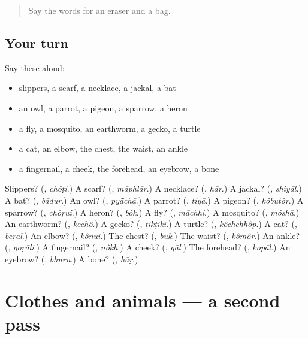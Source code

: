 \label{lesson:BN-R129-first-pass-fruit-vegetables-and-food}



\begin{quote}
Say the words for an eraser and a bag.
\end{quote}

\subsection*{Your turn}
Say these aloud:

\begin{itemize}
\raggedright
  \item slippers, a scarf, a necklace, a jackal, a bat
  \item an owl, a parrot, a pigeon, a sparrow, a heron
  \item a fly, a mosquito, an earthworm, a gecko, a turtle
  \item a cat, an elbow, the chest, the waist, an ankle
  \item a fingernail, a cheek, the forehead, an eyebrow, a bone
\end{itemize}

\begin{tcolorbox}[breakable,colback=teal!4,colframe=teal!35!black,title={Before you move on}]
Slippers? (\textbf{}, \emph{chôṭi}.) A scarf? (\textbf{}, \emph{māphlār}.) A necklace? (\textbf{}, \emph{hār}.) A jackal? (\textbf{}, \emph{shiyāl}.) A bat? (\textbf{}, \emph{bādur}.) An owl? (\textbf{}, \emph{pyā̃chā}.) A parrot? (\textbf{}, \emph{tiyā}.) A pigeon? (\textbf{}, \emph{kôbutôr}.) A sparrow? (\textbf{}, \emph{chôṛui}.) A heron? (\textbf{}, \emph{bôk}.) A fly? (\textbf{}, \emph{māchhi}.) A mosquito? (\textbf{}, \emph{môshā}.) An earthworm? (\textbf{}, \emph{kechô}.) A gecko? (\textbf{}, \emph{ṭikṭiki}.) A turtle? (\textbf{}, \emph{kôchchhôp}.) A cat? (\textbf{}, \emph{beṛāl}.) An elbow? (\textbf{}, \emph{kônui}.) The chest? (\textbf{}, \emph{buk}.) The waist? (\textbf{}, \emph{kômôr}.) An ankle? (\textbf{}, \emph{goṛāli}.) A fingernail? (\textbf{}, \emph{nôkh}.) A cheek? (\textbf{}, \emph{gāl}.) The forehead? (\textbf{}, \emph{kopāl}.) An eyebrow? (\textbf{}, \emph{bhuru}.) A bone? (\textbf{}, \emph{hāṛ}.)
\end{tcolorbox}
\section[(dialogue)]{Clothes and animals — a second pass}


